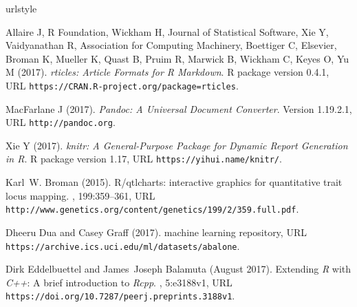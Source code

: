 \documentclass[letterpaper,9pt,twocolumn,twoside,]{pinp}
\begin{document}

\pnasbreak 



\begin{thebibliography}{3}
\newcommand{\enquote}[1]{``#1''}
\providecommand{\natexlab}[1]{#1}
\providecommand{\url}[1]{\texttt{#1}}
\providecommand{\urlprefix}{URL }
\expandafter\ifx\csname urlstyle\endcsname\relax
  \providecommand{\doi}[1]{doi:\discretionary{}{}{}#1}\else
  \providecommand{\doi}{doi:\discretionary{}{}{}\begingroup
  \urlstyle{rm}\Url}\fi
\providecommand{\eprint}[2][]{\url{#2}}



Allaire J, {R Foundation}, Wickham H, {Journal of Statistical Software}, Xie Y,
  Vaidyanathan R, {Association for Computing Machinery}, Boettiger C,
  {Elsevier}, Broman K, Mueller K, Quast B, Pruim R, Marwick B, Wickham C,
  Keyes O, Yu M (2017).
\newblock \emph{rticles: Article Formats for R Markdown}.
\newblock R package version 0.4.1,
  \urlprefix\url{https://CRAN.R-project.org/package=rticles}.

MacFarlane J (2017).
\newblock \emph{Pandoc: A Universal Document Converter}.
\newblock Version 1.19.2.1, \urlprefix\url{http://pandoc.org}.

Xie Y (2017).
\newblock \emph{knitr: A General-Purpose Package for Dynamic Report Generation
  in R}.
\newblock R package version 1.17, \urlprefix\url{https://yihui.name/knitr/}.

Karl~W. Broman (2015).
\newblock R/qtlcharts: interactive graphics for quantitative trait locus
  mapping.
, 199:359--361, \urlprefix\url{http://www.genetics.org/content/genetics/199/2/359.full.pdf}.

Dheeru Dua and Casey Graff (2017).
 machine learning repository, \urlprefix\url{https://archive.ics.uci.edu/ml/datasets/abalone}.

Dirk Eddelbuettel and James~Joseph Balamuta (August 2017).
\newblock Extending \textit{R} with \textit{C++}: A brief introduction to
  \textit{Rcpp}.
, 5:e3188v1, \urlprefix \url{https://doi.org/10.7287/peerj.preprints.3188v1}.


\end{thebibliography}
\end{document}
